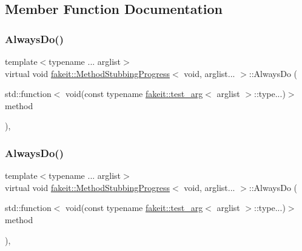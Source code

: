 \subsection{Member Function Documentation}
\mbox{\label{structfakeit_1_1MethodStubbingProgress_3_01void_00_01arglist_8_8_8_01_4_a3e7ae0c7da9cc0eb29d499b889805eb9}} 
\subsubsection{\texorpdfstring{AlwaysDo()}{AlwaysDo()}\hspace{0.1cm}{\footnotesize\ttfamily [1/9]}}
{\footnotesize\ttfamily template$<$typename ... arglist$>$ \\
virtual void \mbox{\hyperlink{structfakeit_1_1MethodStubbingProgress}{fakeit\+::\+Method\+Stubbing\+Progress}}$<$ void, arglist... $>$\+::Always\+Do (\begin{DoxyParamCaption}\item[{std\+::function$<$ void(const typename \mbox{\hyperlink{structfakeit_1_1test__arg}{fakeit\+::test\+\_\+arg}}$<$ arglist $>$\+::type...)$>$}]{method }\end{DoxyParamCaption})\hspace{0.3cm}{\ttfamily [inline]}, {\ttfamily [virtual]}}

\mbox{\label{structfakeit_1_1MethodStubbingProgress_3_01void_00_01arglist_8_8_8_01_4_a3e7ae0c7da9cc0eb29d499b889805eb9}} 
\subsubsection{\texorpdfstring{AlwaysDo()}{AlwaysDo()}\hspace{0.1cm}{\footnotesize\ttfamily [2/9]}}
{\footnotesize\ttfamily template$<$typename ... arglist$>$ \\
virtual void \mbox{\hyperlink{structfakeit_1_1MethodStubbingProgress}{fakeit\+::\+Method\+Stubbing\+Progress}}$<$ void, arglist... $>$\+::Always\+Do (\begin{DoxyParamCaption}\item[{std\+::function$<$ void(const typename \mbox{\hyperlink{structfakeit_1_1test__arg}{fakeit\+::test\+\_\+arg}}$<$ arglist $>$\+::type...)$>$}]{method }\end{DoxyParamCaption})\hspace{0.3cm}{\ttfamily [inline]}, {\ttfamily [virtual]}}

